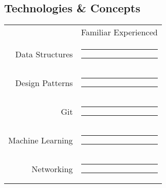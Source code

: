 \documentclass[11pt]{article}
\newcommand{\smpad}{\hspace*{.2em}}
\begin{document}
\begin{multicols}{2}
{{\begin{minipage}[t][\paperheight]{.38\textwidth}
\begin{minipage}[t][\paperheight]{.95\textwidth}
\subsection{\large\dotfill Technologies \& Concepts\dotfill}
\vspace{-1ex}\hspace{.5em}
\begin{tabularx}{\textwidth}{@{}r@{}c@{}}
	\hfill & \footnotesize Familiar \hspace*{1.7em} Experienced\\
	\small Data Structures \smpad&%
		\color{skillLvl}\rule[.25ex]{7.5em}{1ex}%
		\color{skillBkgd}\rule[.25ex]{2.5em}{1ex}\\
	\small Design Patterns \smpad&%
		\color{skillLvl}\rule[.25ex]{5em}{1ex}%
		\color{skillBkgd}\rule[.25ex]{5em}{1ex}\\
	Git \smpad&%
		\color{skillLvl}\rule[.25ex]{4em}{1ex}%
		\color{skillBkgd}\rule[.25ex]{6em}{1ex}\\
	\small Machine Learning \smpad&%
		\color{skillLvl}\rule[.25ex]{3em}{1ex}%
		\color{skillBkgd}\rule[.25ex]{7em}{1ex}\\
	Networking \smpad&%
		\color{skillLvl}\rule[.25ex]{3em}{1ex}%
		\color{skillBkgd}\rule[.25ex]{7em}{1ex}\\
\end{tabularx}
%
\end{minipage}\end{minipage}}}%
%
%
\columnbreak

\end{multicols}
\end{document}

